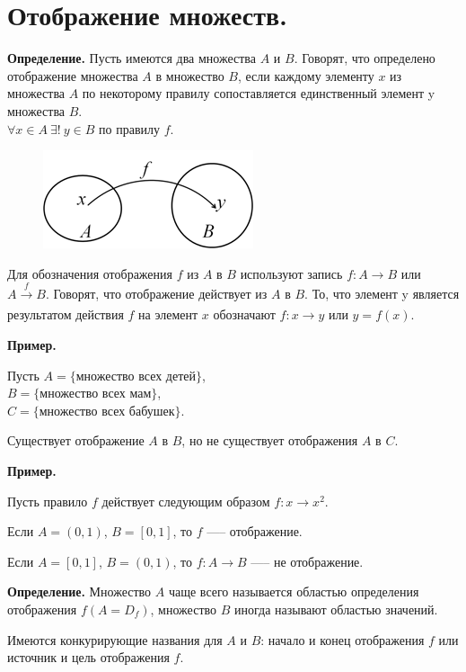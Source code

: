 \documentclass{article}
\begin{document}
    \section{Отображение множеств.}

    \textbf{Определение.} Пусть имеются два множества $A$ и $B$. Говорят, что определено отображение множества $A$ в множество $B$, если каждому элементу $x$ из множества $A$ по некоторому правилу сопоставляется единственный элемент y множества $B$.\\
    $\forall x \in A\ \exists!\ y \in B$ по правилу $f$.
    
    \begin{figure}[h!]
    \centering
    \includegraphics[scale=0.75]{2_1}
    \end{figure}

    Для обозначения отображения $f$ из $A$ в $B$ используют запись $f: A \rightarrow B$ или $A \xrightarrow[]{f} B$. Говорят, что отображение действует из $A$ в $B$. То, что элемент y является результатом действия $f$ на элемент $x$ обозначают $f: x \rightarrow y$ или $y = f(x)$.

    \textbf{Пример.}

    Пусть $A = \{$множество всех детей$\}$,\\
    $B = \{$множество всех мам$\}$,\\
    $C = \{$множество всех бабушек$\}$.

    Существует отображение $A$ в $B$, но не существует отображения $A$ в $C$.  
    
    \textbf{Пример.}
    
    Пусть правило $f$ действует следующим образом $f: x \rightarrow x^2$.
    
    Если $A = (0, 1)$, $B = [0, 1]$, то $f$ —-- отображение.
    
    Если $A = [0, 1]$, $B = (0, 1)$, то $f: A \rightarrow B$ —-- не отображение. 

    \textbf{Определение.} Множество $A$ чаще всего называется областью определения отображения $f (A = D_f)$, множество $B$ иногда называют областью значений.

    Имеются конкурирующие названия для $A$ и $B$: начало и конец отображения $f$ или источник и цель отображения $f$. 
    
\end{document}

